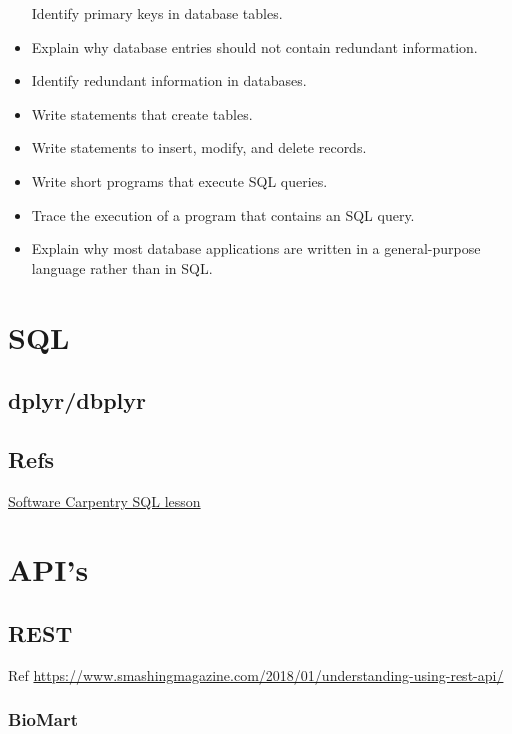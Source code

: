\documentclass[]{book}
\begin{document}
\begin{itemize}
  Identify primary keys in database tables.
\item
  Explain why database entries should not contain redundant information.
\item
  Identify redundant information in databases.
\item
  Write statements that create tables.
\item
  Write statements to insert, modify, and delete records.
\item
  Write short programs that execute SQL queries.
\item
  Trace the execution of a program that contains an SQL query.
\item
  Explain why most database applications are written in a
  general-purpose language rather than in SQL.
\end{itemize}

\hypertarget{sql-1}{%
\section{SQL}\label{sql-1}}

\hypertarget{dplyrdbplyr}{%
\subsection{dplyr/dbplyr}\label{dplyrdbplyr}}

\hypertarget{refs}{%
\subsection{Refs}\label{refs}}

\href{https://swcarpentry.github.io/sql-novice-survey/}{Software
Carpentry SQL lesson}

\hypertarget{apis}{%
\section{API's}\label{apis}}

\hypertarget{rest}{%
\subsection{REST}\label{rest}}

Ref
\url{https://www.smashingmagazine.com/2018/01/understanding-using-rest-api/}

\hypertarget{biomart}{%
\subsubsection{BioMart}\label{biomart}}
\end{document}
